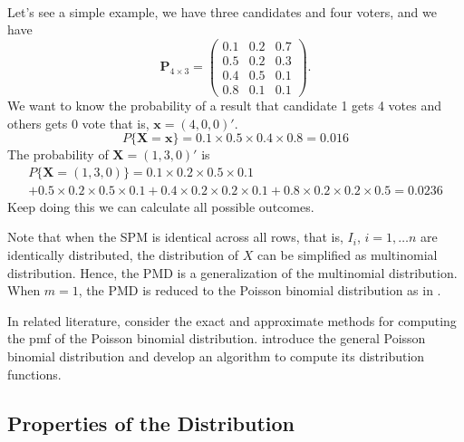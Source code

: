 \documentclass[12pt]{article}
\newcommand{\Xmat}{\mathbf{X}}
\newcommand{\Pmat}{\mathbf{P}}
\begin{document}
\\
Let's see a simple example, we have three candidates and four voters, and we have
\begin{equation*}
\Pmat_{4 \times 3} = \begin{pmatrix}
0.1 &  0.2 & 0.7\\
0.5 & 0.2 & 0.3\\
0.4 &  0.5 & 0.1\\
0.8 & 0.1 & 0.1
\end{pmatrix}.
\end{equation*}
We want to know the probability of a result that candidate 1 gets 4 votes and others  gets 0 vote that is, $\boldsymbol{x} =  (4,0,0)'$.
\begin{equation*}
P\{\Xmat = \boldsymbol{x}\} = 0.1\times 0.5 \times 0.4 \times 0.8 = 0.016
\end{equation*}
The probability of $\Xmat=(1,3,0)'$ is
 \begin{multline*}
 P\{\Xmat = (1,3,0)\} = 0.1\times 0.2 \times 0.5 \times 0.1\\ +
 0.5\times0.2\times0.5 \times 0.1 + 0.4\times0.2\times0.2\times0.1 + 0.8\times0.2\times0.2\times0.5 = 0.0236
 \end{multline*}
Keep doing this we can calculate all possible outcomes.


Note that when the SPM is identical across all rows, that is, $I_{i}$, $i = 1, \dots n$ are identically distributed, the distribution of $X$ can be simplified as multinomial distribution. Hence, the PMD is a generalization of the multinomial distribution. When $m=1$, the PMD is reduced to the Poisson binomial distribution as in .

In related literature,  consider the exact and approximate methods for computing the pmf of the Poisson binomial distribution.  introduce the general Poisson binomial distribution and develop an algorithm to compute its distribution functions.


\subsection{Properties of the Distribution}
\end{document}

